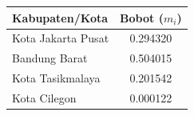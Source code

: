 \begin{longtable}{lc}
\hline
\textbf{Kabupaten/Kota} & \textbf{Bobot ($m_i$)} \\
\hline
Kota Jakarta Pusat & 0.294320 \\
\hline
Bandung Barat & 0.504015 \\
\hline
Kota Tasikmalaya & 0.201542 \\
\hline
Kota Cilegon & 0.000122 \\
\hline
\end{longtable}
